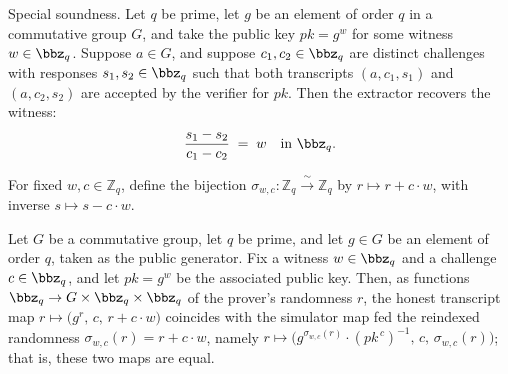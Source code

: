 \begin{theorem}
\label{Schnorr.schnorr_soundness}
\leanok
{}
Special soundness. Let $q$ be prime, let $g$ be an element of order $q$ in a commutative
group $G$, and take the public key $\mathit{pk} = g^{w}$ for some witness $w \in
\bbz_q$. Suppose $a \in G$, and suppose $c_1, c_2 \in \bbz_q$ are distinct challenges
with responses $s_1, s_2 \in \bbz_q$ such that both transcripts $(a, c_1, s_1)$ and $(a,
c_2, s_2)$ are accepted by the verifier for $\mathit{pk}$. Then the extractor recovers
the witness:
\[
  \frac{s_1 - s_2}{c_1 - c_2} \;=\; w \quad\text{in } \bbz_q.
\]
\end{theorem}

\begin{definition}
\label{Schnorr.reindex}
\leanok
For fixed $w, c \in \mathbb{Z}_q$, define the bijection
$\sigma_{w,c} : \mathbb{Z}_q \xrightarrow{\;\sim\;} \mathbb{Z}_q$ by
$r \mapsto r + c \cdot w$, with inverse $s \mapsto s - c \cdot w$.
\end{definition}

\begin{theorem}
\label{Schnorr.schnorr_hvzk}
\leanok
{}
Let $G$ be a commutative group, let $q$ be prime, and let $g \in G$ be an element of
order $q$, taken as the public generator. Fix a witness $w \in \bbz_q$ and a challenge
$c \in \bbz_q$, and let $\mathit{pk} = g^{w}$ be the associated public key. Then, as
functions $\bbz_q \to G \times \bbz_q \times \bbz_q$ of the prover's randomness $r$, the
honest transcript map $r \mapsto \big(g^{r},\, c,\, r + c\cdot w\big)$ coincides with
the simulator map fed the reindexed randomness $\sigma_{w,c}(r) = r + c\cdot w$, namely
$r \mapsto \big(g^{\sigma_{w,c}(r)}\cdot(\mathit{pk}^{\,c})^{-1},\, c,\,
\sigma_{w,c}(r)\big)$; that is, these two maps are equal.
\end{theorem}

